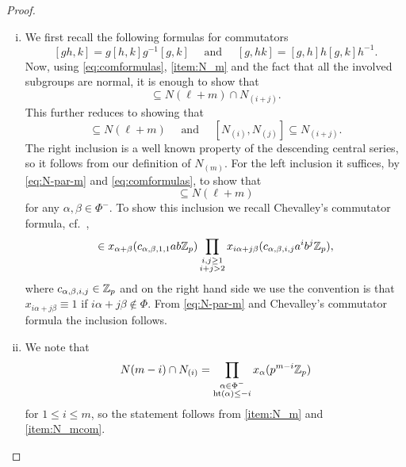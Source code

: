 \begin{proof}
\begin{enumerate}[(i),wide]
  \item We first recall the following formulas for commutators
    \begin{equation}\label{eq:comformulas}
      [gh,k] = g[h,k]g^{-1}[g,k] \quad \text{ and } \quad [g,hk] = [g,h]h[g,k]h^{-1}.
    \end{equation}
    Now, using \eqref{eq:comformulas}, \ref{item:N_m} and the fact that all the involved subgroups are normal, it is enough to show that
    \begin{equation*}
      [N(\ell) \cap N_{(i)}, N(m) \cap N_{(j)}] \subseteq N(\ell+m) \cap N_{(i+j)}.
    \end{equation*}
    This further reduces to showing that
    \begin{equation*}
      [N(\ell),N(m)] \subseteq N(\ell+m) \quad \text{ and } \quad [N_{(i)},N_{(j)}] \subseteq N_{(i+j)}.
    \end{equation*}
    The right inclusion is a well known property of the descending central series, so it follows from our definition of $N_{(m)}$. For the left inclusion it suffices, by \eqref{eq:N-par-m} and \eqref{eq:comformulas}, to show that
    \begin{equation*}
      [x_\alpha(p^\ell \Z_p), x_\beta(p^m \Z_p)] \subseteq N(\ell + m)
    \end{equation*}
    for any $\alpha,\beta \in \Phi^{-}$. To show this inclusion we recall Chevalley's commutator formula, cf.\ \cite[Prop.~5.1.14]{Con-book},
    \begin{equation*}
      [x_\alpha(a),x_\beta(b)] \in x_{\alpha+\beta}(c_{\alpha,\beta,1,1}ab\Z_p) \prod_{\substack{i,j \geq 1 \\ i+j > 2}} x_{i\alpha + j\beta}(c_{\alpha,\beta,i,j}a^{i}b^{j}\Z_p),
    \end{equation*}
    where $c_{\alpha,\beta,i,j} \in \mathbb{Z}_{p}$ and on the right hand side we use the convention is that $x_{i\alpha + j\beta} \equiv 1$ if $i\alpha + j\beta \notin \Phi$. From \eqref{eq:N-par-m} and Chevalley's commutator formula the inclusion follows.

  \item We note that
    \begin{equation*}
      N(m-i) \cap N_{(i)} = \prod_{\substack{\alpha \in \Phi^{-} \\ \operatorname{ht}(\alpha) \leq -i}} x_\alpha(p^{m-i} \mathbb{Z}_p)
    \end{equation*}
    for $1 \leq i \leq m$, so the statement follows from \ref{item:N_m} and \ref{item:N_mcom}.


\end{enumerate}
\end{proof}
